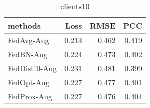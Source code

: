 \begin{table}
\caption{clients10}
\begin{tabular}{lrrr}
\toprule
methods & Loss & RMSE & PCC \\
\midrule
FedAvg-Aug & 0.213 & 0.462 & 0.419 \\
FedBN-Aug & 0.224 & 0.473 & 0.402 \\
FedDistill-Aug & 0.231 & 0.481 & 0.399 \\
FedOpt-Aug & 0.227 & 0.477 & 0.401 \\
FedProx-Aug & 0.227 & 0.476 & 0.404 \\
\bottomrule
\end{tabular}
\end{table}
